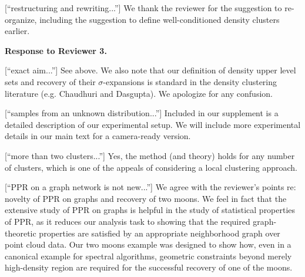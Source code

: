 \documentclass{article}
\begin{document}
[``restructuring and rewriting...''] We thank the reviewer for the suggestion to re-organize, including the suggestion to define well-conditioned density clusters earlier.

\textbf{Response to Reviewer 3. }

[``exact aim...''] See above. We also note that our definition of density upper level sets and recovery of their $\sigma$-expansions is standard in the density clustering literature (e.g. Chaudhuri and Dasgupta).  We apologize for any confusion.


[``samples from an unknown distribution...''] Included in our supplement is a detailed description of our experimental setup. We will include more experimental details in our main text for a camera-ready version.

[``more than two clusters...''] Yes, the method (and theory) holds for any number of clusters, which is one of the appeals of considering a local clustering approach.

[``PPR on a graph network is not new...''] We agree with the reviewer's points re: novelty of PPR on graphs and recovery of two moons. We feel in fact that the extensive study of PPR on graphs is helpful in the study of statistical properties of PPR, as it reduces our analysis task to showing that the required graph-theoretic properties are satisfied by an appropriate neighborhood graph over point cloud data. Our two moons example was designed to show how, even in a canonical example for spectral algorithms, geometric constraints beyond merely high-density region are required for the successful recovery of one of the moons.
\end{document}
